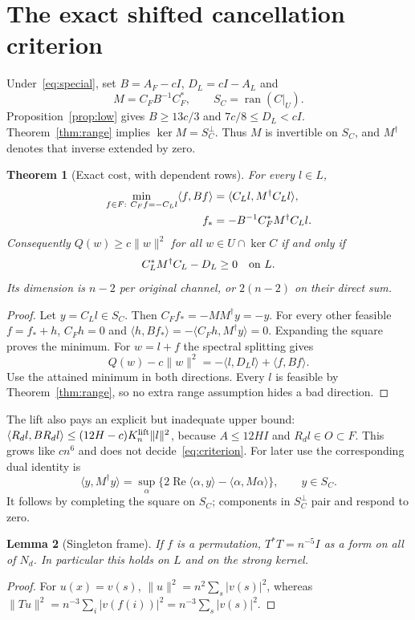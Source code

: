 \documentclass[11pt]{article}
\newcommand{\norm}[1]{\lVert#1\rVert}
\newcommand{\ip}[2]{\langle#1,#2\rangle}
\DeclareMathOperator{\ran}{ran}
\DeclareMathOperator{\Rea}{Re}
\newtheorem{theorem}{Theorem}[section]
\newtheorem{lemma}[theorem]{Lemma}
\theoremstyle{definition}
\theoremstyle{remark}
\begin{document}
\section{The exact shifted cancellation criterion}\label{sec:cost}
Under~\eqref{eq:special}, set $B=A_F-cI$, $D_L=cI-A_L$ and
\[
 M=C_FB^{-1}C_F^*,\qquad S_C=\ran(C|_U).
\]
Proposition~\ref{prop:low} gives $B\ge13c/3$ and $7c/8\le D_L<cI$.
Theorem~\ref{thm:range} implies $\ker M=S_C^\perp$. Thus $M$ is invertible
on $S_C$, and $M^\dagger$ denotes that inverse extended by zero.

\begin{theorem}[Exact cost, with dependent rows]\label{thm:cost}
For every $l\in L$,
\begin{align}\label{eq:mincost}
 \min_{f\in F:\ C_Ff=-C_Ll}\ip f{Bf}
       &=\ip{C_Ll}{M^\dagger C_Ll},\\
 f_*&=-B^{-1}C_F^*M^\dagger C_Ll.\notag
\end{align}
Consequently $Q(w)\ge c\norm w^2$ for all $w\in U\cap\ker C$ if and only if
\begin{equation}\label{eq:criterion}
                  C_L^*M^\dagger C_L-D_L\ge0\quad\hbox{on }L.
\end{equation}
Its dimension is $n-2$ per original channel, or $2(n-2)$ on their direct sum.
\end{theorem}
\begin{proof}
Let $y=C_Ll\in S_C$. Then $C_Ff_*=-MM^\dagger y=-y$. For every other
feasible $f=f_*+h$, $C_Fh=0$ and
$\ip h{Bf_*}=-\ip{C_Fh}{M^\dagger y}=0$. Expanding the square proves
the minimum. For $w=l+f$ the spectral splitting gives
\[
        Q(w)-c\norm w^2=-\ip l{D_Ll}+\ip f{Bf}.
\]
Use the attained minimum in both directions. Every $l$ is feasible by
Theorem~\ref{thm:range}, so no extra range assumption hides a bad direction.
\end{proof}

The lift also pays an explicit but inadequate upper bound:
$\ip{R_dl}{BR_dl}\le(12H-c)K_n^{\rm lift}\norm l^2$, because
$A\le12HI$ and $R_dl\in O\subset F$. This grows like $cn^6$ and does not
decide~\eqref{eq:criterion}.
For later use the corresponding dual identity is
\begin{equation}\label{eq:dual}
 \ip y{M^\dagger y}
   =\sup_\alpha\{2\Rea\ip\alpha y-\ip\alpha{M\alpha}\},\qquad y\in S_C.
\end{equation}
It follows by completing the square on $S_C$; components in $S_C^\perp$
pair and respond to zero.

\begin{lemma}[Singleton frame]\label{lem:frame}
If $f$ is a permutation, $T^*T=n^{-5}I$ as a form on all of $N_d$.
In particular this holds on $L$ and on the strong kernel.
\end{lemma}
\begin{proof}
For $u(x)=v(s)$, $\norm u^2=n^2\sum_s|v(s)|^2$, whereas
$\norm{Tu}^2=n^{-3}\sum_i|v(f(i))|^2=n^{-3}\sum_s|v(s)|^2$.
\end{proof}
\end{document}

